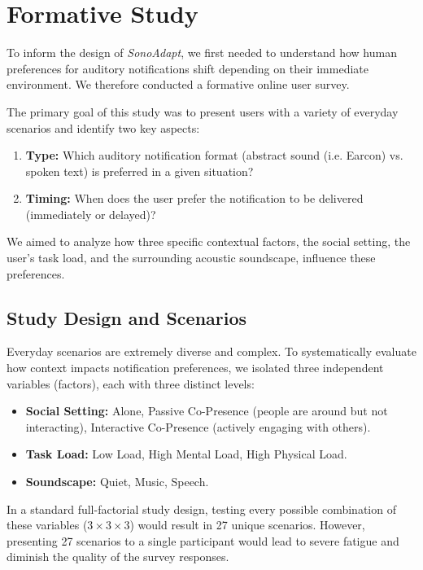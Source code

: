 \chapter{Formative Study}
\label{chap:formative_study}

To inform the design of \textit{SonoAdapt}, we first needed to understand how human preferences for auditory notifications shift depending on their immediate environment. We therefore conducted a formative online user survey. 

The primary goal of this study was to present users with a variety of everyday scenarios and identify two key aspects:
\begin{enumerate}
    \item \textbf{Type:} Which auditory notification format (abstract sound (i.e. Earcon) vs. spoken text) is preferred in a given situation?
    \item \textbf{Timing:} When does the user prefer the notification to be delivered (immediately or delayed)?
\end{enumerate}
We aimed to analyze how three specific contextual factors, the social setting, the user's task load, and the surrounding acoustic soundscape, influence these preferences.

\section{Study Design and Scenarios}
\label{sec:study_design}

Everyday scenarios are extremely diverse and complex. To systematically evaluate how context impacts notification preferences, we isolated three independent variables (factors), each with three distinct levels:
\begin{itemize}
    \item \textbf{Social Setting:} Alone, Passive Co-Presence (people are around but not interacting), Interactive Co-Presence (actively engaging with others).
    \item \textbf{Task Load:} Low Load, High Mental Load, High Physical Load.
    \item \textbf{Soundscape:} Quiet, Music, Speech.
\end{itemize}

In a standard full-factorial study design, testing every possible combination of these variables ($3 \times 3 \times 3$) would result in 27 unique scenarios. However, presenting 27 scenarios to a single participant would lead to severe fatigue and diminish the quality of the survey responses. 

